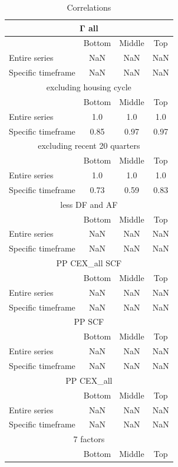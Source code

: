\begin{table}[h!]
\centering
\caption{Correlations}
\begin{tabular}{|l|c|c|c|}
\hline
\multicolumn{4}{|c|}{Γ all} \\ \hline
& Bottom & Middle & Top \\ \hline
Entire series & NaN & NaN & NaN \\ \hline
Specific timeframe & NaN & NaN & NaN \\ \hline
\multicolumn{4}{|c|}{excluding housing cycle} \\ \hline
& Bottom & Middle & Top \\ \hline
Entire series & 1.0 & 1.0 & 1.0 \\ \hline
Specific timeframe & 0.85 & 0.97 & 0.97 \\ \hline
\multicolumn{4}{|c|}{excluding recent 20 quarters} \\ \hline
& Bottom & Middle & Top \\ \hline
Entire series & 1.0 & 1.0 & 1.0 \\ \hline
Specific timeframe & 0.73 & 0.59 & 0.83 \\ \hline
\multicolumn{4}{|c|}{less DF and AF} \\ \hline
& Bottom & Middle & Top \\ \hline
Entire series & NaN & NaN & NaN \\ \hline
Specific timeframe & NaN & NaN & NaN \\ \hline
\multicolumn{4}{|c|}{PP CEX_all SCF} \\ \hline
& Bottom & Middle & Top \\ \hline
Entire series & NaN & NaN & NaN \\ \hline
Specific timeframe & NaN & NaN & NaN \\ \hline
\multicolumn{4}{|c|}{PP SCF} \\ \hline
& Bottom & Middle & Top \\ \hline
Entire series & NaN & NaN & NaN \\ \hline
Specific timeframe & NaN & NaN & NaN \\ \hline
\multicolumn{4}{|c|}{PP CEX_all} \\ \hline
& Bottom & Middle & Top \\ \hline
Entire series & NaN & NaN & NaN \\ \hline
Specific timeframe & NaN & NaN & NaN \\ \hline
\multicolumn{4}{|c|}{7 factors} \\ \hline
& Bottom & Middle & Top \\ \hline

\end{tabular}
\end{table}
